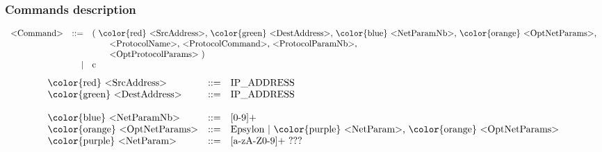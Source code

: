 \documentclass{beamer}
\begin{document}
\begin{frame}
    \frametitle{Commands description}

    {\scriptsize
    \[
        \begin{array}{l r l}
            \text{<Command>} & ::= & \text{( {\color{red} <SrcAddress>}, {\color{green} <DestAddress>}, {\color{blue} <NetParamNb>}, {\color{orange} <OptNetParams>,}} \\
                             &     & \text{~~~~~~<ProtocolName>, <ProtocolCommand>, <ProtocolParamNb>,} \\
                             &     & \text{~~~~~~<OptProtocolParams> )} \\
                             &   | & \text{c} \\
        \end{array}
    \]
    }
    \pause
    \vfill
    \[
        \begin{array}{l r l}
            \text{{\color{red} <SrcAddress>}}      & ::= & \text{IP\_ADDRESS} \\
            \text{{\color{green} <DestAddress>}}   & ::= & \text{IP\_ADDRESS} \\
                                                   &     & \\
            \text{{\color{blue} <NetParamNb>}}     & ::= & \text{[0-9]+} \\
            \text{{\color{orange} <OptNetParams>}} & ::= & \text{Epsylon | {\color{purple} <NetParam>}, {\color{orange} <OptNetParams>}} \\
            \text{{\color{purple} <NetParam>}}     & ::= & \text{[a-zA-Z0-9]+ ???} \\
        \end{array}
    \]
\end{frame}
\end{document}
